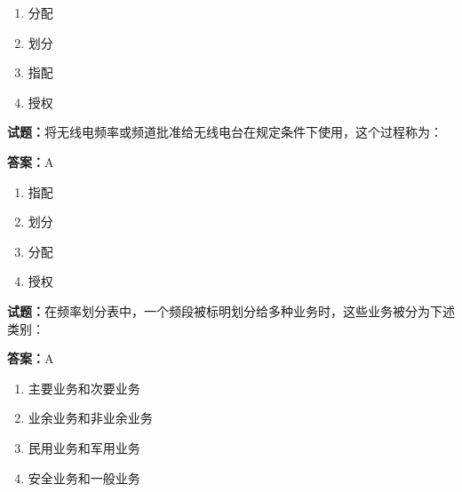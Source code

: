 \documentclass{ctexbook}
\begin{document}
\begin{enumerate}[leftmargin=3em]
  \item 分配 

  \item 划分 

  \item 指配 

  \item 授权 

\end{enumerate}





\vspace{1em}

\textbf{试题：}将无线电频率或频道批准给无线电台在规定条件下使用，这个过程称为： 

\textbf{答案：}A 

\begin{enumerate}[leftmargin=3em]
  \item 指配 

  \item 划分 

  \item 分配 

  \item 授权 

\end{enumerate}





\vspace{1em}

\textbf{试题：}在频率划分表中，一个频段被标明划分给多种业务时，这些业务被分为下述类别： 

\textbf{答案：}A 


\begin{enumerate}[leftmargin=3em]
  \item 主要业务和次要业务 

  \item 业余业务和非业余业务 

  \item 民用业务和军用业务 

  \item 安全业务和一般业务 

\end{enumerate}

\end{document}
